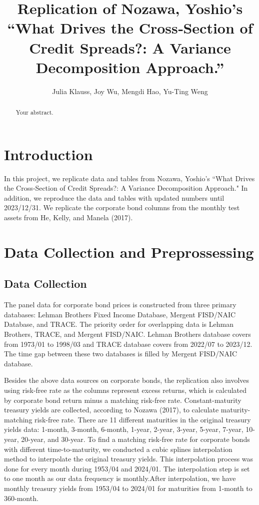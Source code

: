 \documentclass{article}
\title{Replication of Nozawa, Yoshio's “What Drives the Cross‐Section of Credit Spreads?: A Variance Decomposition Approach.”}
\author{Julia Klauss, Joy Wu, Mengdi Hao, Yu-Ting Weng}
\begin{document}
\maketitle

\begin{abstract}
Your abstract.
\end{abstract}

\section{Introduction}

In this project, we replicate data and tables from Nozawa, Yoshio's “What Drives the Cross‐Section of Credit Spreads?: A Variance Decomposition Approach." In addition, we reproduce the data and tables with updated numbers until 2023/12/31. We replicate the corporate bond columns from the monthly test assets from He, Kelly, and Manela (2017). 

\section{ Data Collection and Preprossessing}

\subsection{Data Collection}

The panel data for corporate bond prices is constructed from three primary databases: Lehman Brothers Fixed Income Database, Mergent FISD/NAIC Database, and TRACE. The priority order for overlapping data is Lehman Brothers, TRACE, and Mergent FISD/NAIC. Lehman Brothers database covers from 1973/01 to 1998/03 and TRACE database covers from 2022/07 to 2023/12. The time gap between these two databases is filled by Mergent FISD/NAIC database.

Besides the above data sources on corporate bonds, the replication also involves using risk-free rate as the columns represent excess returns, which is calculated by corporate bond return minus a matching risk-free rate. Constant-maturity treasury yields are collected, according to Nozawa (2017), to calculate maturity-matching risk-free rate. There are 11 different maturities in the original treasury yields data: 1-month, 3-month, 6-month, 1-year, 2-year, 3-year, 5-year, 7-year, 10-year, 20-year, and 30-year. To find a matching risk-free rate for corporate bonds with different time-to-maturity, we conducted a cubic splines interpolation method to interpolate the original treasury yields. This interpolation process was done for every month during 1953/04 and 2024/01. The interpolation step is set to one month as our data frequency is monthly.After interpolation, we have monthly treasury yields from 1953/04 to 2024/01 for maturities from 1-month to 360-month.
\end{document}

